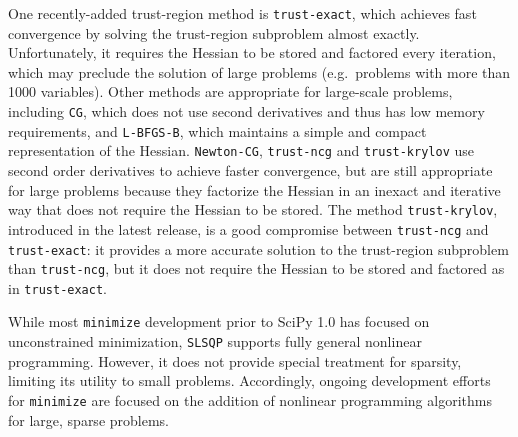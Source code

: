 One recently-added trust-region method is \texttt{trust-exact},
which achieves fast convergence by solving the trust-region subproblem almost exactly.
Unfortunately, it requires the Hessian to be stored and factored every iteration, which may preclude
the solution of large problems (e.g.~problems with more than 1000 variables).
Other methods are appropriate for large-scale problems, including
\texttt{CG}, which does not use second derivatives and thus has low memory requirements, and \texttt{L-BFGS-B}, which maintains a simple and compact representation of the Hessian.
\texttt{Newton-CG}, \texttt{trust-ncg} and \texttt{trust-krylov} use second order derivatives to achieve faster
convergence, but are still appropriate for large problems because they factorize the Hessian in an inexact and iterative way that does not require the Hessian to be stored.
The method \texttt{trust-krylov}, introduced in the latest release, is a good compromise between
\texttt{trust-ncg} and \texttt{trust-exact}: it provides a more accurate solution to the trust-region
subproblem than \texttt{trust-ncg}, but it does not require the Hessian to be stored and factored as in \texttt{trust-exact}.

While most \texttt{minimize} development prior to SciPy 1.0 has focused on unconstrained minimization, 
\texttt{SLSQP} supports fully general nonlinear programming. However, it does not provide special treatment for sparsity, limiting its utility to small problems. Accordingly, ongoing development efforts for \texttt{minimize} are focused on the addition of nonlinear programming algorithms for large, sparse problems. 


